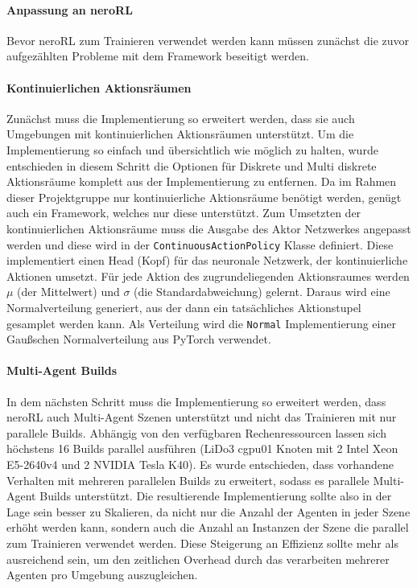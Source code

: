 \paragraph{Anpassung an neroRL} \label{neroAnpassungKonzept}
Bevor neroRL zum Trainieren verwendet werden kann müssen zunächst die zuvor aufgezählten Probleme mit dem Framework beseitigt werden.\\

\paragraph{Kontinuierlichen Aktionsräumen} \fup
Zunächst muss die Implementierung so erweitert werden, dass sie auch Umgebungen mit kontinuierlichen Aktionsräumen unterstützt. 
Um die Implementierung so einfach und übersichtlich wie möglich zu halten, wurde entschieden in diesem Schritt die Optionen für Diskrete und Multi diskrete Aktionsräume komplett aus der Implementierung zu entfernen. Da im Rahmen dieser Projektgruppe nur kontinuierliche Aktionsräume benötigt werden, genügt auch ein Framework, welches nur diese unterstützt. Zum Umsetzten der kontinuierlichen Aktionsräume muss die Ausgabe des Aktor Netzwerkes angepasst werden und diese wird in der \texttt{ContinuousActionPolicy} Klasse definiert. Diese implementiert einen Head (Kopf) für das neuronale Netzwerk, der kontinuierliche Aktionen umsetzt. Für jede Aktion des zugrundeliegenden Aktionsraumes werden $\mu$ (der Mittelwert) und $\sigma$ (die Standardabweichung) gelernt. Daraus wird eine Normalverteilung generiert, aus der dann ein tatsächliches Aktionstupel gesamplet werden kann. Als Verteilung wird die \texttt{Normal} Implementierung einer Gaußschen Normalverteilung aus PyTorch verwendet.

\paragraph{Multi-Agent Builds} \fup
In dem nächsten Schritt muss die Implementierung so erweitert werden, dass neroRL auch Multi-Agent Szenen unterstützt und nicht das Trainieren mit nur parallele Builds.
Abhängig von den verfügbaren Rechenressourcen lassen sich höchstens 16 Builds parallel ausführen (LiDo3 cgpu01 Knoten mit 2 Intel Xeon E5-2640v4 und 2 NVIDIA Tesla K40). 
Es wurde entschieden, dass vorhandene Verhalten mit mehreren parallelen Builds zu erweitert, sodass es parallele Multi-Agent Builds unterstützt. 
Die resultierende Implementierung sollte also in der Lage sein besser zu Skalieren, da nicht nur die Anzahl der Agenten in jeder Szene erhöht werden kann, sondern auch die Anzahl an Instanzen der Szene die parallel zum Trainieren verwendet werden. Diese Steigerung an Effizienz sollte mehr als ausreichend sein, um den zeitlichen Overhead durch das verarbeiten mehrerer Agenten pro Umgebung auszugleichen.

